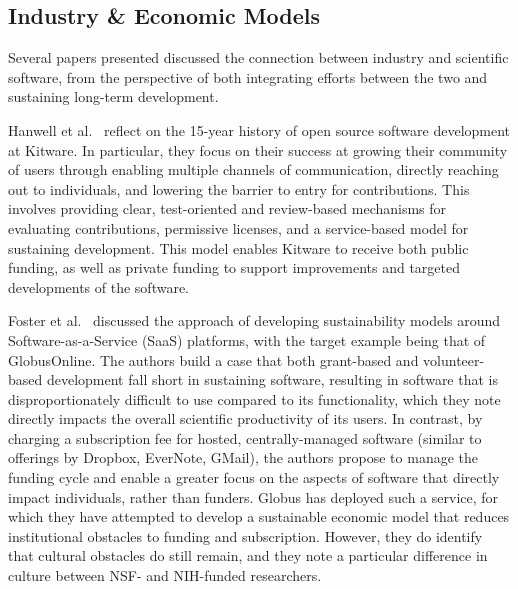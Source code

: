 \documentclass[11pt, oneside]{amsart}
\newcommand{\toolname}[1] {\textsf{#1}}
\begin{document}
\subsection{Industry \& Economic Models}

Several papers presented discussed the connection between industry and
scientific software, from the perspective of both integrating efforts
between the two and sustaining long-term development.

Hanwell et al.~\cite{Hanwell_WSSSPE} reflect on the 15-year history of
open source software development at \toolname{Kitware}.  In
particular, they focus on their success at growing their community of
users through enabling multiple channels of communication, directly
reaching out to individuals, and lowering the barrier to entry for
contributions. This involves providing clear, test-oriented and
review-based mechanisms for evaluating contributions, permissive
licenses, and a service-based model for sustaining development.  This
model enables \toolname{Kitware} to receive both public funding, as
well as private funding to support improvements and targeted
developments of the software.

Foster et al.~\cite{Foster_WSSSPE} discussed the approach of
developing sustainability models around Software-as-a-Service (SaaS)
platforms, with the target example being that of
\toolname{GlobusOnline}.  The authors build a case that both
grant-based and volunteer-based development fall short in sustaining
software, resulting in software that is disproportionately difficult
to use compared to its functionality, which they note directly impacts
the overall scientific productivity of its users.  In contrast, by
charging a subscription fee for hosted, centrally-managed software
(similar to offerings by \toolname{Dropbox}, \toolname{EverNote},
\toolname{GMail}), the authors propose to manage the funding cycle and
enable a greater focus on the aspects of software that directly impact
individuals, rather than funders.  \toolname{Globus} has deployed such
a service, for which they have attempted to develop a sustainable
economic model that reduces institutional obstacles to funding and
subscription.  However, they do identify that cultural obstacles do
still remain, and they note a particular difference in culture between
NSF- and NIH-funded researchers.
\end{document}
